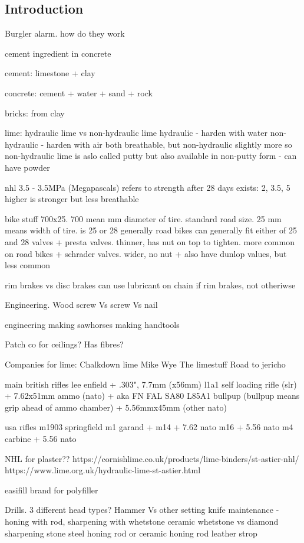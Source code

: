 
\subsection{Introduction}

Burgler alarm. how do they work

	cement ingredient in concrete

	cement: limestone + clay

	concrete: cement + water + sand + rock

	bricks: from clay

	lime: hydraulic lime vs non-hydraulic lime
		hydraulic - harden with water
		non-hydraulic - harden with air
		both breathable, but non-hydraulic slightly more so
		non-hydraulic lime is aslo called putty
			but also available in non-putty form - can have powder

		nhl 3.5 - 3.5MPa (Megapascals)
		refers to strength after 28 days
		exists: 2, 3.5, 5
			higher is stronger but less breathable

bike stuff
700x25. 700 mean mm diameter of tire. standard road size. 25 mm means width of tire. is 25 or 28 generally
road bikes can generally fit either of 25 and 28
valves
+ presta valves. thinner, has nut on top to tighten. more common on road bikes
+ schrader valves. wider, no nut
+ also have dunlop values, but less common

rim brakes vs disc brakes
can use lubricant on chain if rim brakes, not otheriwse

Engineering. Wood screw Vs screw Vs nail


engineering
	making sawhorses
	making handtools

Patch co for ceilings? Has fibres?

Companies for lime:
Chalkdown lime
Mike Wye
The limestuff
Road to jericho

main british rifles
lee enfield
+ .303", 7.7mm (x56mm)
l1a1 self loading rifle (slr)
+ 7.62x51mm ammo (nato)
+ aka FN FAL
SA80 L85A1 bullpup (bullpup means grip ahead of ammo chamber)
+ 5.56mmx45mm (other nato)

usa rifles
m1903 springfield
m1 garand
+ 
m14
+ 7.62 nato
m16
+ 5.56 nato
m4 carbine
+ 5.56 nato


NHL for plaster??
https://cornishlime.co.uk/products/lime-binders/st-astier-nhl/
https://www.lime.org.uk/hydraulic-lime-st-astier.html

easifill brand for polyfiller

Drills. 3 different head types?
Hammer Vs other setting
knife maintenance - honing with rod, sharpening with whetstone
ceramic whetstone vs diamond sharpening stone
steel honing rod or ceramic honing rod
leather strop

